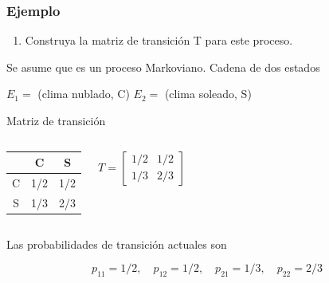 \documentclass[spanish]{beamer}
\begin{document}
\begin{frame}
\frametitle{Ejemplo}
\begin{enumerate}
\item Construya la matriz de transición T para este proceso.
\end{enumerate}

Se asume que es un proceso Markoviano. Cadena de dos estados 

\begin{center}
$E_{1}=$ (clima nublado, C) \hspace{2em} $E_{2}=$ (clima soleado, S)
\end{center} 
Matriz de transición 
\begin{columns}
\begin{center}
\begin{tabular}{ c c c }
  & C & S \\ 
  \hline
 C & 1/2 & 1/2 \\  
 S & 1/3 & 2/3    
\end{tabular}
\end{center}
\begin{center}

\begin{equation*}
T= \begin{bmatrix}
1/2 & 1/2 \\
1/3 & 2/3  
\end{bmatrix}
\end{equation*}

\end{center}
\end{columns}
Las probabilidades de transición actuales son

\begin{equation*}
p_{11} = 1/2, \quad p_{12} = 1/2,  \quad p_{21} = 1/3,  \quad p_{22} = 2/3
\end{equation*}



\end{frame}

\end{document}
